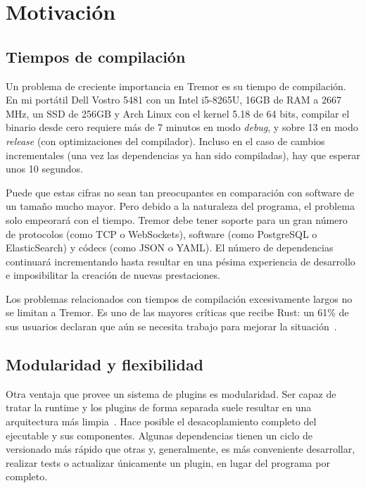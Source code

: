 \section{Motivación}

\subsection{Tiempos de compilación}

Un problema de creciente importancia en Tremor es su tiempo de compilación. En
mi portátil Dell Vostro 5481 con un Intel i5-8265U, 16GB de RAM a 2667 MHz, un
SSD de 256GB y Arch Linux con el kernel 5.18 de 64 bits, compilar el binario
 desde cero requiere más de 7 minutos en modo \emph{debug}, y sobre
13 en modo \emph{release} (con optimizaciones del compilador). Incluso en el
caso de cambios incrementales (una vez las dependencias ya han sido compiladas),
hay que esperar unos 10 segundos.

Puede que estas cifras no sean tan preocupantes en comparación con software de
un tamaño mucho mayor. Pero debido a la naturaleza del programa, el problema
solo empeorará con el tiempo. Tremor debe tener soporte para un gran número de
protocolos (como TCP o WebSockets), software (como PostgreSQL o ElasticSearch) y
códecs (como JSON o YAML). El número de dependencias continuará incrementando
hasta resultar en una pésima experiencia de desarrollo e imposibilitar la
creación de nuevas prestaciones.

Los problemas relacionados con tiempos de compilación excesivamente largos no se
limitan a Tremor. Es uno de las mayores críticas que recibe Rust: un 61\% de sus
usuarios declaran que aún se necesita trabajo para mejorar la
situación~\cite{rustsurvey}.

\subsection{Modularidad y flexibilidad}

Otra ventaja que provee un sistema de plugins es modularidad. Ser capaz de
tratar la runtime y los plugins de forma separada suele resultar en una
arquitectura más limpia~\cite{baldwin2000design}. Hace posible el
desacoplamiento completo del ejecutable y sus componentes. Algunas dependencias
tienen un ciclo de versionado más rápido que otras y, generalmente, es más
conveniente desarrollar, realizar tests o actualizar únicamente un plugin, en
lugar del programa por completo.

